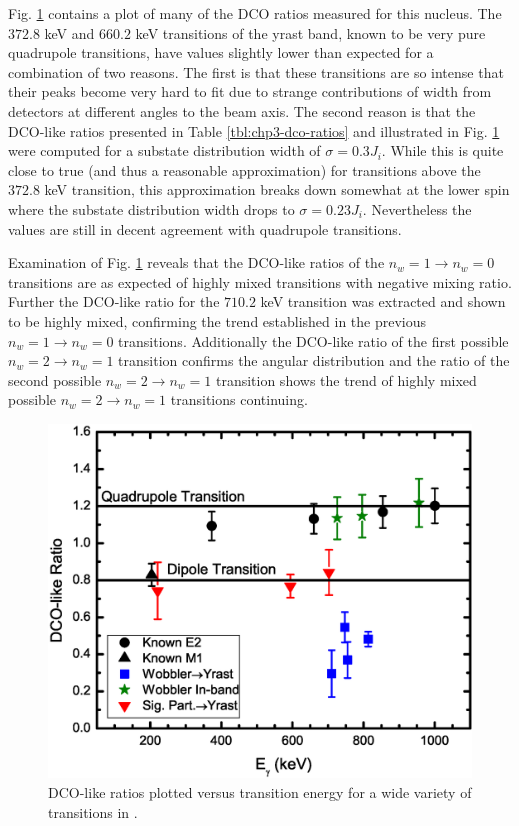 Fig. \ref{fig:chp4-dco} contains a plot of many of the DCO ratios measured for this nucleus. The $372.8$ keV and $660.2$ keV transitions of the yrast band, known to be very pure quadrupole transitions, have values slightly lower than expected for a combination of two reasons. The first is that these transitions are so intense that their peaks become very hard to fit due to strange contributions of width from detectors at different angles to the beam axis. The second reason is that the DCO-like ratios presented in Table \ref{tbl:chp3-dco-ratios} and illustrated in Fig. \ref{fig:chp4-dco} were computed for a substate distribution width of $\sigma{}=0.3J_i$. While this is quite close to true (and thus a reasonable approximation) for transitions above the $372.8$ keV transition, this approximation breaks down somewhat at the lower spin where the substate distribution width drops to $\sigma{}=0.23J_i$. Nevertheless the values are still in decent agreement with quadrupole transitions.

Examination of Fig. \ref{fig:chp4-dco} reveals that the DCO-like ratios of the $n_w=1\rightarrow{}n_w=0$ transitions are as expected of highly mixed transitions with negative mixing ratio. Further the DCO-like ratio for the $710.2$ keV transition was extracted and shown to be highly mixed, confirming the trend established in the previous $n_w=1\rightarrow{}n_w=0$ transitions. Additionally the DCO-like ratio of the first possible $n_w=2\rightarrow{}n_w=1$ transition confirms the angular distribution and the ratio of the second possible $n_w=2\rightarrow{}n_w=1$ transition shows the trend of highly mixed possible $n_w=2\rightarrow{}n_w=1$ transitions continuing.

\begin{figure}[t!]
\centerline{\includegraphics[width=\textwidth]{./img/c4/DCO.eps}}
	\caption{DCO-like ratios plotted versus transition energy for a wide variety of transitions in \pr{}.\label{fig:chp4-dco}}
\end{figure}

